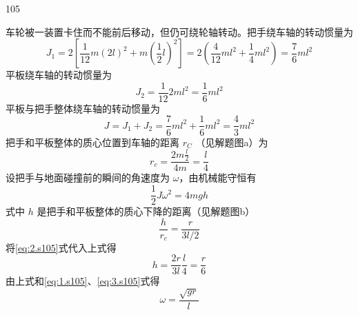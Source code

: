 \begin{solution}{105}
\begin{subsolution}
车轮被一装置卡住而不能前后移动，但仍可绕轮轴转动。把手绕车轴的转动惯量为
\[
J_{1} = 2\left[ \frac{1}{12} m (2l)^{2} + m\left(\frac{1}{2}l\right)^{2} \right] = 2\left(\frac{4}{12} m l^{2} + \frac{1}{4} m l^{2}\right) = \frac{7}{6} m l^{2}
\]
平板绕车轴的转动惯量为
\[
J_{2} = \frac{1}{12} 2m l^{2} = \frac{1}{6} m l^{2}
\]
平板与把手整体绕车轴的转动惯量为
\begin{equation}
J = J_{1} + J_{2} = \frac{7}{6} m l^{2} + \frac{1}{6} m l^{2} = \frac{4}{3} m l^{2}
\label{eq:1.s105}
\end{equation}
把手和平板整体的质心位置到车轴的距离 $r_{C}$ （见解题图a）为
\begin{equation}
r_{c} = \frac{2m \frac{l}{2}}{4m} = \frac{l}{4}
\label{eq:2.s105}
\end{equation}
设把手与地面碰撞前的瞬间的角速度为 $\omega$，由机械能守恒有
\begin{equation}
\frac{1}{2} J \omega^{2} = 4 m g h
\label{eq:3.s105}
\end{equation}
式中 $h$ 是把手和平板整体的质心下降的距离（见解题图b）
\[
\frac{h}{r_{c}} = \frac{r}{3l/2}
\]
将\eqref{eq:2.s105}式代入上式得
\[
h = \frac{2r}{3l}\frac{l}{4} = \frac{r}{6}
\]
由上式和\eqref{eq:1.s105}、\eqref{eq:3.s105}式得
\begin{equation}
\omega = \frac{\sqrt{g r}}{l}
\label{eq:4.s105}
\end{equation}
\end{subsolution}


\end{solution}
